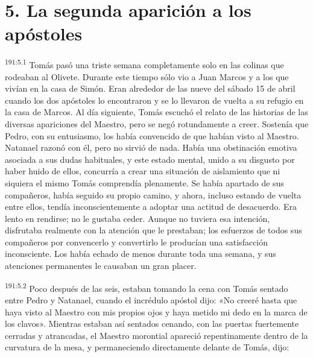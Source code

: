 \section*{5. La segunda aparición a los apóstoles}
\par 
\textsuperscript{191:5.1} Tomás pasó una triste semana completamente solo en las colinas que rodeaban al Olivete. Durante este tiempo sólo vio a Juan Marcos y a los que vivían en la casa de Simón. Eran alrededor de las nueve del sábado 15 de abril cuando los dos apóstoles lo encontraron y se lo llevaron de vuelta a su refugio en la casa de Marcos. Al día siguiente, Tomás escuchó el relato de las historias de las diversas apariciones del Maestro, pero se negó rotundamente a creer. Sostenía que Pedro, con su entusiasmo, los había convencido de que habían visto al Maestro. Natanael razonó con él, pero no sirvió de nada. Había una obstinación emotiva asociada a sus dudas habituales, y este estado mental, unido a su disgusto por haber huido de ellos, concurría a crear una situación de aislamiento que ni siquiera el mismo Tomás comprendía plenamente. Se había apartado de sus compañeros, había seguido su propio camino, y ahora, incluso estando de vuelta entre ellos, tendía inconscientemente a adoptar una actitud de desacuerdo. Era lento en rendirse; no le gustaba ceder. Aunque no tuviera esa intención, disfrutaba realmente con la atención que le prestaban; los esfuerzos de todos sus compañeros por convencerlo y convertirlo le producían una satisfacción inconsciente. Los había echado de menos durante toda una semana, y sus atenciones permanentes le causaban un gran placer.

\par 
\textsuperscript{191:5.2} Poco después de las seis, estaban tomando la cena con Tomás sentado entre Pedro y Natanael, cuando el incrédulo apóstol dijo: «No creeré hasta que haya visto al Maestro con mis propios ojos y haya metido mi dedo en la marca de los clavos». Mientras estaban así sentados cenando, con las puertas fuertemente cerradas y atrancadas, el Maestro morontial apareció repentinamente dentro de la curvatura de la mesa, y permaneciendo directamente delante de Tomás, dijo:


